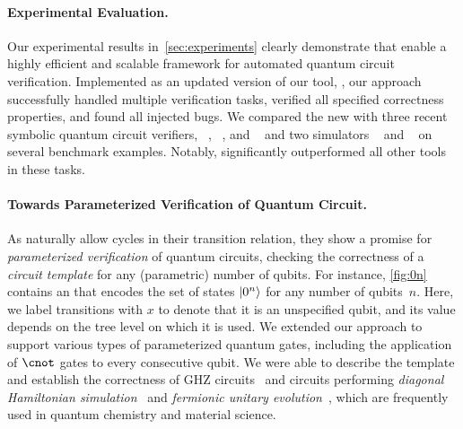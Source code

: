  
 
\paragraph{Experimental Evaluation.}
Our experimental results in~\cref{sec:experiments} clearly demonstrate that \lstas enable a highly efficient and scalable framework for automated quantum circuit verification. 
Implemented as an updated version of our tool, \tool, our approach successfully handled multiple verification tasks, verified all specified correctness properties, and found all injected bugs. We compared the new \tool with three recent symbolic quantum circuit verifiers, \autoq~\cite{ChenCLLTY23}, 
\caal~\cite{chen2023theory}, and \symqv~\cite{BauerMarquartLS23} and two simulators \sliqsim~\cite{TsaiJJ21} and \svsim~\cite{li2021svsim} on several benchmark examples.
Notably, \tool significantly outperformed all other tools in these tasks.

\figZeron

\paragraph{Towards Parameterized Verification of Quantum Circuit.}  
As \lstas naturally allow cycles in their transition relation, they show a promise for \emph{parameterized verification} of quantum circuits, 
checking the correctness of a \emph{circuit template} for any (parametric) number of qubits. 
For instance, \cref{fig:0n} contains an \lsta that encodes the set of states
$\ket{0^n}$ for any number of qubits~$n$. Here, we label transitions with $x$ to
denote that it is an unspecified qubit, and its value depends on the tree level
on which it is used.
We extended our approach to support various types of
parameterized quantum gates, including the application of $\cnot$ gates to every
consecutive qubit. We were able to describe the template and establish the
correctness of GHZ circuits~\cite{GreenbergerHZ89} and circuits performing
\emph{diagonal Hamiltonian simulation}~\cite{McArdleEA20} and \emph{fermionic unitary
evolution}~\cite{YordanovADB20}, which are frequently used in quantum chemistry
and material science. 






